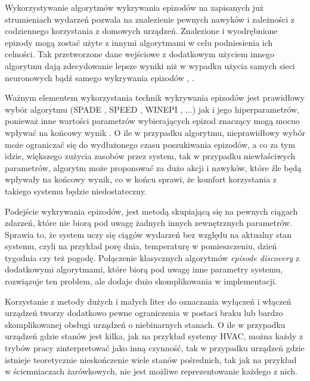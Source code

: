 Wykorzystywanie algorytmów wykrywania epizodów na zapisanych już strumieniach wydarzeń pozwala na znalezienie pewnych nawyków i zależności z codziennego korzystania z domowych urządzeń. Znalezione i wyodrębnione epizody mogą zostać użyte z innymi algorytmami w celu podniesienia ich celności. Tak przetworzone dane wejściowe z dodatkowym użyciem innego algorytmu dają zdecydowanie lepsze wyniki niż w wypadku użycia samych sieci neuronowych bądź samego wykrywania epizodów \cite{episode_discovery_1}, \cite{episode_discovery_2}. 


Ważnym elementem wykorzystania technik wykrywania epizodów jest prawidłowy wybór algorytmu (SPADE \cite{SPADE}, SPEED \cite{SPEED}, WINEPI \cite{WINEPI}, ...) jak i jego hiperparametrów, ponieważ inne wartości parametrów wybierających epizod znaczący mogą mocno wpływać na końcowy wynik \cite{episode_discovery_2}. O ile w przypadku algorytmu, nieprawidłowy wybór może ograniczać się do wydłużonego czasu poszukiwania epizodów, a co za tym idzie, większego zużycia zasobów przez system, tak w przypadku niewłaściwych parametrów, algorytm może proponować za dużo akcji i nawyków, które źle będą wpływały na końcowy wynik, co w końcu sprawi, że komfort korzystania z takiego systemu będzie niedostateczny.

Podejście wykrywania epizodów, jest metodą skupiającą się na pewnych ciągach zdarzeń, które nie biorą pod uwagę żadnych innych zewnętrznych parametrów. Sprawia to, że system uczy się ciągów wydarzeń bez względu na aktualny stan systemu, czyli na przykład porę dnia, temperaturę w pomieszczeniu, dzień tygodnia czy też pogodę. Połączenie klasycznych algorytmów \textit{episode discovery} z dodatkowymi algorytmami, które biorą pod uwagę inne parametry systemu, rozwiązuje ten problem, ale dodaje dużo skomplikowania w implementacji.

Korzystanie z metody dużych i małych liter do oznaczania wyłączeń i włączeń urządzeń tworzy dodatkowo pewne ograniczenia w postaci braku lub bardzo skomplikowanej obsługi urządzeń o niebinarnych stanach. O ile w przypadku urządzeń gdzie stanów jest kilka, jak na przykład systemy HVAC, można każdy z trybów pracy zinterpretować jako inną czynność, tak w przypadku urządzeń gdzie istnieje teoretycznie nieskończenie wiele stanów pośrednich, tak jak na przykład w ściemniaczach żarówkowych, nie jest możliwe reprezentowanie każdego z nich.

